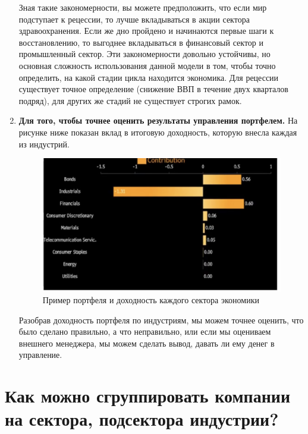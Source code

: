 \documentclass{article}
\begin{document}
\begin{enumerate}
		Зная такие закономерности, вы можете предположить, что если мир подступает к рецессии, то лучше вкладываться в акции сектора здравоохранения. Если же дно пройдено и начинаются первые шаги к восстановлению, то выгоднее вкладываться в финансовый сектор и промышленный сектор. Эти закономерности довольно устойчивы, но основная сложность использования данной модели в том, чтобы точно определить, на какой стадии цикла находится экономика. Для рецессии существует точное определение (снижение ВВП в течение двух кварталов подряд), для других же стадий не существует строгих рамок.
		\newpage
		\item \textbf{Для того, чтобы точнее оценить результаты управления портфелем.} На рисунке ниже показан вклад в итоговую доходность, которую внесла каждая из индустрий.
		\begin{figure}[h]
			\centering
			\includegraphics[scale =0.3]{example_port.jpg}
			\caption{Пример портфеля и доходность каждого сектора экономики}
			\label{model}
		\end{figure}
		
		Разобрав доходность портфеля по индустриям, мы можем точнее оценить, что было сделано правильно, а что неправильно, или если мы оцениваем внешнего менеджера, мы можем сделать вывод, давать ли ему денег в управление.
		
	\end{enumerate}
	
	
	
	\section{Как можно сгруппировать компании на сектора, подсектора индустрии?}
\end{document}
